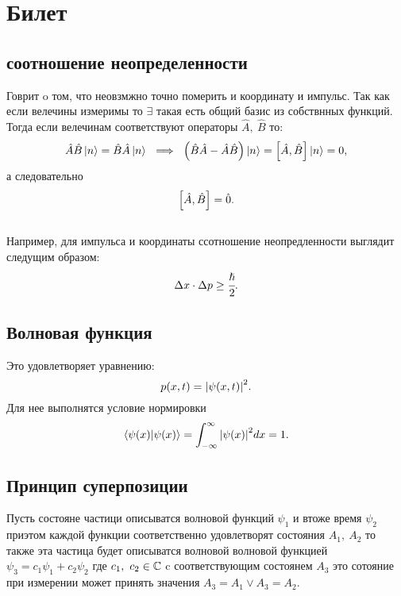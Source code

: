\section{Билет}
\subsection{соотношение неопределенности}
Говрит o том, что неовзмжно точно померить и координату и импульс.
 Так как если велечины измеримы то $\exists$ такая есть общий базис 
 из собствнных функций. Тогда если велечинам соответствуют 
 операторы $\hat A,\ \hat B$ то:
\begin{equation*} 
 \hat A \hat B \ket{n} = \hat B \hat A  \ket{n} \ \implies\ 
 \inner{\hat B \hat A - \hat A \hat B} \ket{n} = 
 \insqr{\hat A, \hat B}\ket{n} = 0,
\end{equation*}
а следовательно 
\begin{equation} 
 \left[ \hat A, \hat B \right] = \hat 0.
\end{equation} 
\\
Например, для импульса и координаты ссотношение неопредленности 
выглядит следущим образом:
\begin{equation} 
 \Delta x \cdot \Delta p \geq \cfrac{\hslash}{2}.
\end{equation} 

\subsection{Волновая функция}
Это удовлетворяет уравнению:
\begin{equation} 
 p (x, t) = \abs{\psi (x, t)}^2.
\end{equation} 
Для нее выполнятся условие нормировки 
\begin{equation} 
 \braket{\psi (x)}{\psi (x)} = \int_{-\infty}^{\infty} 
  \abs{\psi (x)}^2 dx = 1.
\end{equation} 
   
\subsection{Принцип суперпозиции}
Пусть состояне частици описыватся волновой функций $\psi_1$
 и втоже время $\psi_2$ приэтом каждой функции соответственно удовлетворят
 состояния $A_1, \ A_2$ то также эта частица будет описыватся волновой 
 волновой функцией $\psi_3 = c_1 \psi_1 + c_2 \psi_2$ где $c_1, \ c_2 \in 
 \mathbb{C}$ c соответствующим состоянем $A_3$ это сотояние при 
 измерении может принять значения $A_3 = A_1 \lor A_3 = A_2$.
 









